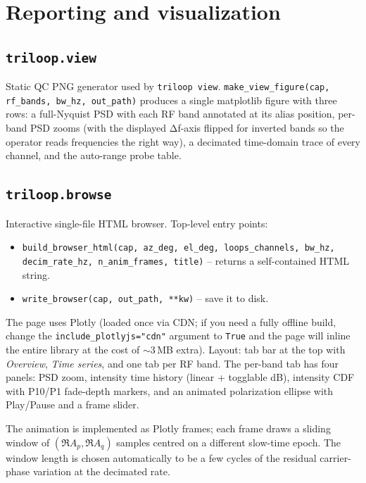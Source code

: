 \documentclass[11pt]{article}
\begin{document}
\section{Reporting and visualization}

\subsection{\texttt{triloop.view}}

Static QC PNG generator used by \texttt{triloop view}.
\texttt{make\_view\_figure(cap, rf\_bands, bw\_hz, out\_path)}
produces a single matplotlib figure with three rows: a full-Nyquist
PSD with each RF band annotated at its alias position, per-band PSD
zooms (with the displayed Δf-axis flipped for inverted bands so the
operator reads frequencies the right way), a decimated time-domain
trace of every channel, and the auto-range probe table.

\subsection{\texttt{triloop.browse}}

Interactive single-file HTML browser.  Top-level entry points:

\begin{itemize}\itemsep=2pt
\item \texttt{build\_browser\_html(cap, az\_deg, el\_deg,
      loops\_channels, bw\_hz, decim\_rate\_hz, n\_anim\_frames,
      title)} -- returns a self-contained HTML string.
\item \texttt{write\_browser(cap, out\_path, **kw)} -- save it to disk.
\end{itemize}

The page uses Plotly (loaded once via CDN; if you need a fully offline
build, change the \texttt{include\_plotlyjs="cdn"} argument to
\texttt{True} and the page will inline the entire library at the cost
of $\sim 3$\,MB extra).  Layout: tab bar at the top with
\textit{Overview}, \textit{Time series}, and one tab per RF band.
The per-band tab has four panels: PSD zoom, intensity time history
(linear + togglable dB), intensity CDF with P10/P1 fade-depth markers,
and an animated polarization ellipse with Play/Pause and a frame
slider.

The animation is implemented as Plotly frames; each frame draws a
sliding window of $(\Re A_p, \Re A_q)$ samples centred on a different
slow-time epoch.  The window length is chosen automatically to be a
few cycles of the residual carrier-phase variation at the decimated
rate.
\end{document}
